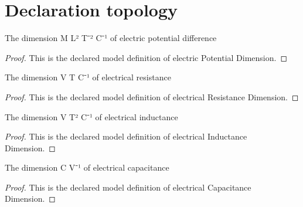 \section{Declaration topology}
\begin{definition}
  \label{def:physics:phyx-mini-0889:phyxminiproblems-problemphyxmini0889-electricpotentialdimension}
  The dimension M L² T⁻² C⁻¹ of electric potential difference
\end{definition}
\begin{proof}
  This is the declared model definition of electric Potential Dimension.
\end{proof}
\begin{definition}
  \label{def:physics:phyx-mini-0889:phyxminiproblems-problemphyxmini0889-electricalresistancedimension}
  The dimension V T C⁻¹ of electrical resistance
\end{definition}
\begin{proof}
  This is the declared model definition of electrical Resistance Dimension.
\end{proof}
\begin{definition}
  \label{def:physics:phyx-mini-0889:phyxminiproblems-problemphyxmini0889-electricalinductancedimension}
  The dimension V T² C⁻¹ of electrical inductance
\end{definition}
\begin{proof}
  This is the declared model definition of electrical Inductance Dimension.
\end{proof}
\begin{definition}
  \label{def:physics:phyx-mini-0889:phyxminiproblems-problemphyxmini0889-electricalcapacitancedimension}
  The dimension C V⁻¹ of electrical capacitance
\end{definition}
\begin{proof}
  This is the declared model definition of electrical Capacitance Dimension.
\end{proof}

